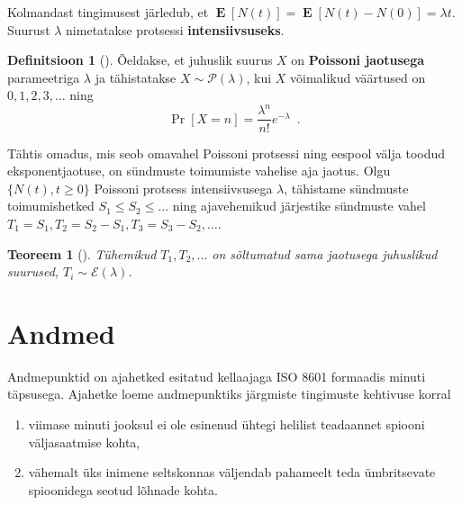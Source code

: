 \documentclass{article}
\newtheorem{theorem}{Teoreem}
\theoremstyle{definition}
\newtheorem{definition}{Definitsioon}
\DeclareMathOperator*{\MEAN}{\mathbf{E}}
\newcommand{\mean}[1]{\MEAN\left[#1\right]}
\newcommand{\prob}[1]{\Pr\left[#1\right]}
\begin{document}
Kolmandast tingimusest järledub, et $\mean{N(t)} = \mean{N(t)- N(0)} = \lambda t$. Suurust $\lambda$ nimetatakse protsessi \textbf{intensiivsuseks}.

\begin{definition}[\cite{tõenäosusteooria-algkursus}]
    Õeldakse, et juhuslik suurus $X$ on \textbf{Poissoni jaotusega} parameetriga $\lambda$ ja tähistatakse $X \sim \mathcal{P}(\lambda)$, kui $X$ võimalikud väärtused on $0, 1, 2, 3, \dots$ ning
    \begin{equation*}
        \prob{X = n} = \frac{\lambda^n}{n!} e^{- \lambda} \enspace .
    \end{equation*}
\end{definition}

Tähtis omadus, mis seob omavahel Poissoni protsessi ning eespool välja toodud eksponentjaotuse, on sündmuste toimumiste vahelise aja jaotus. Olgu $\{ N(t) , t \geq 0 \}$ Poissoni protsess intensiivsusega $\lambda$, tähistame sündmuste toimumishetked $S_1 \leq S_2 \leq \dots$ ning ajavehemikud järjestike sündmuste vahel $T_1 = S_1 , T_2 = S_2 - S_1 , T_3 = S_3 - S_2 , \dots$.

\begin{theorem}[{\cite[lk 38]{juhuslikud-protsessid}}]
    \label{trm:tühemikud}
    Tühemikud $T_1 , T_2 , \dots$ on sõltumatud sama jaotusega juhuslikud suurused, $T_i \sim \mathcal{E}(\lambda)$.
\end{theorem}


\section{Andmed}

Andmepunktid on ajahetked esitatud kellaajaga ISO 8601 formaadis minuti täpsusega. Ajahetke loeme andmepunktiks järgmiste tingimuste kehtivuse korral


\begin{enumerate}
    \item viimase minuti jooksul ei ole esinenud ühtegi helilist teadaannet spiooni väljasaatmise kohta,
    \item vähemalt üks inimene seltskonnas väljendab pahameelt teda ümbritsevate spioonidega seotud lõhnade kohta.
\end{enumerate}
\end{document}
